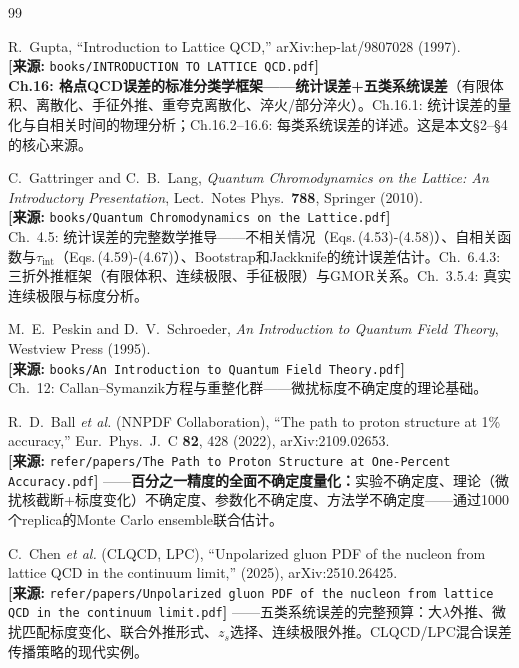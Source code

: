 \documentclass[12pt,a4paper]{ctexart}
\begin{document}
\begin{thebibliography}{99}

R.~Gupta,
``Introduction to Lattice QCD,''
arXiv:hep-lat/9807028 (1997).
\\\textbf{[来源:} \texttt{books/INTRODUCTION TO LATTICE QCD.pdf}\textbf{]}
\\\textbf{Ch.16: 格点QCD误差的标准分类学框架——统计误差+五类系统误差}（有限体积、离散化、手征外推、重夸克离散化、淬火/部分淬火）。Ch.16.1: 统计误差的量化与自相关时间的物理分析；Ch.16.2--16.6: 每类系统误差的详述。这是本文§2--§4的核心来源。

C.~Gattringer and C.~B.~Lang,
\textit{Quantum Chromodynamics on the Lattice: An Introductory Presentation},
Lect.\ Notes Phys.\ \textbf{788}, Springer (2010).
\\\textbf{[来源:} \texttt{books/Quantum Chromodynamics on the Lattice.pdf}\textbf{]}
\\Ch.~4.5: 统计误差的完整数学推导——不相关情况（Eqs.\,(4.53)-(4.58)）、自相关函数与$\tau_{\text{int}}$（Eqs.\,(4.59)-(4.67)）、Bootstrap和Jackknife的统计误差估计。Ch.~6.4.3: 三折外推框架（有限体积、连续极限、手征极限）与GMOR关系。Ch.~3.5.4: 真实连续极限与标度分析。

M.~E.~Peskin and D.~V.~Schroeder,
\textit{An Introduction to Quantum Field Theory},
Westview Press (1995).
\\\textbf{[来源:} \texttt{books/An Introduction to Quantum Field Theory.pdf}\textbf{]}
\\Ch.~12: Callan--Symanzik方程与重整化群——微扰标度不确定度的理论基础。

R.~D.~Ball \textit{et al.} (NNPDF Collaboration),
``The path to proton structure at 1\% accuracy,''
Eur.\ Phys.\ J.\ C \textbf{82}, 428 (2022), arXiv:2109.02653.
\\\textbf{[来源:} \texttt{refer/papers/The Path to Proton Structure at One-Percent Accuracy.pdf}\textbf{]}
——\textbf{百分之一精度的全面不确定度量化：}实验不确定度、理论（微扰核截断+标度变化）不确定度、参数化不确定度、方法学不确定度——通过1000个replica的Monte Carlo ensemble联合估计。

C.~Chen \textit{et al.} (CLQCD, LPC),
``Unpolarized gluon PDF of the nucleon from lattice QCD in the continuum limit,''
(2025), arXiv:2510.26425.
\\\textbf{[来源:} \texttt{refer/papers/Unpolarized gluon PDF of the nucleon from lattice QCD in the continuum limit.pdf}\textbf{]}
——五类系统误差的完整预算：大$\lambda$外推、微扰匹配标度变化、联合外推形式、$z_s$选择、连续极限外推。CLQCD/LPC混合误差传播策略的现代实例。


\end{thebibliography}
\end{document}
